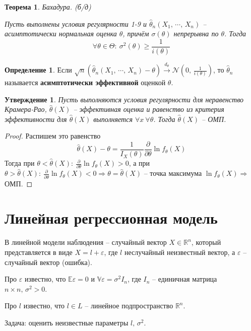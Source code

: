 \documentclass[a4paper,12pt]{article}
\renewcommand{\geq}{\ensuremath{\geqslant}}
\theoremstyle{plain}
\newtheorem{theorem}{Теорема}[section]
\newtheorem{proposition}{Утверждение}[section]
\theoremstyle{definition}
\newtheorem{definition}{Определение}[section]
\theoremstyle{remark}
\begin{document}
\begin{theorem}
  Бахадура. (б/д)

  Пусть выполнены условия регулярности 1-9 и $\hat{\theta}_n(X_1,\,\cdots,\,X_n)$ -- асимптотически нормальная оценка $\theta$, причём $\sigma(\theta)$ непрерывна по $\theta$. Тогда 
  \[
    \forall \theta \in \Theta :\: \sigma^2(\theta) \geq \frac{1}{i(\theta)}
  \]
\end{theorem}

\begin{definition}
  Если $\sqrt{n}(\hat{\theta}_n(X_1,\,\cdots,\,X_n) - \theta) \overset{d_\theta}{\to} \mathcal{N}\left(0,\, \frac{1}{i(\theta)}\right)$, то $\hat{\theta}_n$ называется \textbf{асимптотически эффективной} оценкой $\theta$.
\end{definition}

\begin{proposition}
  Пусть выполняются условия регулярности для неравенство Крамера-Рао, $\hat{\theta}(X)$ -- эффективная оценка и равенство из критерия эффективности для $\hat{\theta}(X)$ выполняется $\forall x \: \forall \theta$. Тогда $\hat{\theta}(X)$ -- ОМП. 
\end{proposition}

\begin{proof}
  Распишем это равенство
  \[
    \hat{\theta}(X) - \theta = \frac{1}{I_X(\theta)}\frac{\partial}{\partial\theta}\ln f_\theta(X)
  \]
  Тогда при $\theta < \hat{\theta}(X) :\: \frac{\partial}{\partial\theta}\ln f_\theta(X) > 0$, а при $\theta > \hat{\theta}(X) :\: \frac{\partial}{\partial\theta}\ln f_\theta(X) < 0 \Rightarrow \theta = \hat{\theta}(X)$ -- точка максимума $\ln f_\theta(X) \Rightarrow$ ОМП.
\end{proof}

\section{Линейная регрессионная модель}
В линейной модели наблюдения -- случайный вектор $X \in \mathbb{R}^n$, который представляется в виде $X = l + \varepsilon$, где $l$ неслучайный неизвестный вектор, а $\varepsilon$ -- случайный вектор (ошибка).

Про $\varepsilon$ известно, что $\mathbb{E}\varepsilon = 0$ и $\mathbb{V}\varepsilon = \sigma^2I_n$, где $I_n$ -- единичная матрица $n \times n,\, \sigma^2 > 0$.

Про $l$ известно, что $l \in L$ -- линейное подпространство $\mathbb{R}^n$.

Задача: оценить неизвестные параметры $l,\, \sigma^2$.
\end{document}
